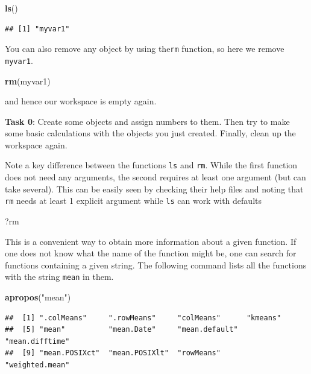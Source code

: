 \documentclass[
]{article}
\newenvironment{Shaded}{\begin{snugshade}}{\end{snugshade}}
\newcommand{\FunctionTok}[1]{\textcolor[rgb]{0.13,0.29,0.53}{\textbf{#1}}}
\newcommand{\NormalTok}[1]{#1}
\newcommand{\StringTok}[1]{\textcolor[rgb]{0.31,0.60,0.02}{#1}}
\begin{document}
\begin{Shaded}
\begin{Highlighting}[]
\FunctionTok{ls}\NormalTok{()}
\end{Highlighting}
\end{Shaded}

\begin{verbatim}
## [1] "myvar1"
\end{verbatim}

You can also remove any object by using the\texttt{rm} function, so here
we remove \texttt{myvar1}.

\begin{Shaded}
\begin{Highlighting}[]
\FunctionTok{rm}\NormalTok{(myvar1)}
\end{Highlighting}
\end{Shaded}

and hence our workspace is empty again.

\textbf{Task 0}: Create some objects and assign numbers to them. Then
try to make some basic calculations with the objects you just created.
Finally, clean up the workspace again.

Note a key difference between the functions \texttt{ls} and \texttt{rm}.
While the first function does not need any arguments, the second
requires at least one argument (but can take several). This can be
easily seen by checking their help files and noting that \texttt{rm}
needs at least 1 explicit argument while \texttt{ls} can work with
defaults

\begin{Shaded}
\begin{Highlighting}[]
\NormalTok{?rm}
\end{Highlighting}
\end{Shaded}

This is a convenient way to obtain more information about a given
function. If one does not know what the name of the function might be,
one can search for functions containing a given string. The following
command lists all the functions with the string \texttt{mean} in them.

\begin{Shaded}
\begin{Highlighting}[]
\FunctionTok{apropos}\NormalTok{(}\StringTok{"mean"}\NormalTok{)}
\end{Highlighting}
\end{Shaded}

\begin{verbatim}
##  [1] ".colMeans"     ".rowMeans"     "colMeans"      "kmeans"       
##  [5] "mean"          "mean.Date"     "mean.default"  "mean.difftime"
##  [9] "mean.POSIXct"  "mean.POSIXlt"  "rowMeans"      "weighted.mean"
\end{verbatim}
\end{document}
